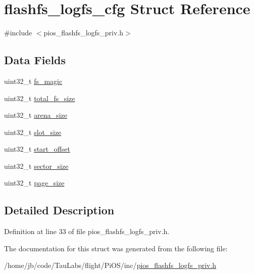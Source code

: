 \hypertarget{structflashfs__logfs__cfg}{\section{flashfs\-\_\-logfs\-\_\-cfg \-Struct \-Reference}
\label{structflashfs__logfs__cfg}
}


{\ttfamily \#include $<$pios\-\_\-flashfs\-\_\-logfs\-\_\-priv.\-h$>$}

\subsection*{\-Data \-Fields}
\begin{DoxyCompactItemize}
\item 
uint32\-\_\-t \hyperlink{group___p_i_o_s___f_l_a_s_h_f_s_ga1fe17f8582e422dfe871844653d7d6f9}{fs\-\_\-magic}
\item 
uint32\-\_\-t \hyperlink{group___p_i_o_s___f_l_a_s_h_f_s_ga36ee534fa25bdd1bece22e997e3ba800}{total\-\_\-fs\-\_\-size}
\item 
uint32\-\_\-t \hyperlink{group___p_i_o_s___f_l_a_s_h_f_s_ga838dc01d5c7c1796252597dbb2d1dc04}{arena\-\_\-size}
\item 
uint32\-\_\-t \hyperlink{group___p_i_o_s___f_l_a_s_h_f_s_gac9f1463cfe49a3b517bf6c1e44bbb087}{slot\-\_\-size}
\item 
uint32\-\_\-t \hyperlink{group___p_i_o_s___f_l_a_s_h_f_s_ga2a71336371b265bddac688b27ebcb94c}{start\-\_\-offset}
\item 
uint32\-\_\-t \hyperlink{group___p_i_o_s___f_l_a_s_h_f_s_ga8251b6447774f97389ec08c71e1ed54b}{sector\-\_\-size}
\item 
uint32\-\_\-t \hyperlink{group___p_i_o_s___f_l_a_s_h_f_s_ga28ddda808f37b1e0a2d6e8ea25c47c59}{page\-\_\-size}
\end{DoxyCompactItemize}


\subsection{\-Detailed \-Description}


\-Definition at line 33 of file pios\-\_\-flashfs\-\_\-logfs\-\_\-priv.\-h.



\-The documentation for this struct was generated from the following file\-:\begin{DoxyCompactItemize}
\item 
/home/jb/code/\-Tau\-Labs/flight/\-Pi\-O\-S/inc/\hyperlink{pios__flashfs__logfs__priv_8h}{pios\-\_\-flashfs\-\_\-logfs\-\_\-priv.\-h}\end{DoxyCompactItemize}
